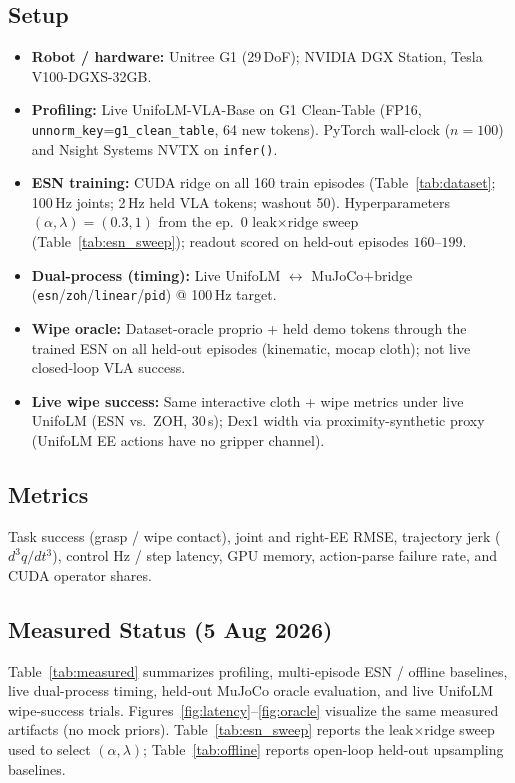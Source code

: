 \documentclass[conference]{IEEEtran}
\begin{document}
\subsection{Setup}
\begin{itemize}
  \item \textbf{Robot / hardware:} Unitree G1 (29\,DoF); NVIDIA DGX Station, Tesla V100-DGXS-32GB.
  \item \textbf{Profiling:} Live UnifoLM-VLA-Base on G1 Clean-Table (FP16,
    \texttt{unnorm\_key}=\texttt{g1\_clean\_table}, 64 new tokens).
    PyTorch wall-clock ($n{=}100$) and Nsight Systems NVTX on \texttt{infer()}.
  \item \textbf{ESN training:} CUDA ridge on all 160 train episodes
    (Table~\ref{tab:dataset}; 100\,Hz joints; 2\,Hz held VLA tokens; washout 50).
    Hyperparameters $(\alpha,\lambda)=(0.3,1)$ from the ep.~0 leak$\times$ridge sweep
    (Table~\ref{tab:esn_sweep}); readout scored on held-out episodes $160$--$199$.
  \item \textbf{Dual-process (timing):} Live UnifoLM $\leftrightarrow$ MuJoCo$+$bridge
    (\texttt{esn}/\texttt{zoh}/\texttt{linear}/\texttt{pid}) @ 100\,Hz target.
  \item \textbf{Wipe oracle:} Dataset-oracle proprio + held demo tokens through the trained ESN
    on all held-out episodes (kinematic, mocap cloth); not live closed-loop VLA success.
  \item \textbf{Live wipe success:} Same interactive cloth + wipe metrics under live UnifoLM
    (ESN vs.\ ZOH, 30\,s); Dex1 width via proximity-synthetic proxy (UnifoLM EE actions have no gripper channel).
\end{itemize}

\subsection{Metrics}
Task success (grasp / wipe contact), joint and right-EE RMSE, trajectory jerk ($d^3q/dt^3$), control Hz / step latency, GPU memory, action-parse failure rate, and CUDA operator shares.

\subsection{Measured Status (5 Aug 2026)}
Table~\ref{tab:measured} summarizes profiling, multi-episode ESN / offline baselines, live dual-process timing, held-out MuJoCo oracle evaluation, and live UnifoLM wipe-success trials.
Figures~\ref{fig:latency}--\ref{fig:oracle} visualize the same measured artifacts (no mock priors).
\mbox{Table~\ref{tab:esn_sweep}} reports the leak$\times$ridge sweep used to select $(\alpha,\lambda)$;
Table~\ref{tab:offline} reports open-loop held-out upsampling baselines.
\end{document}
